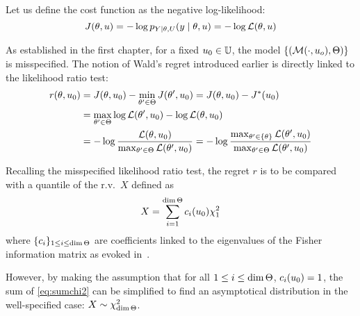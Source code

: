 \documentclass[../../Main_ManuscritThese.tex]{subfiles}
\begin{document}
Let us define the cost function as the negative log-likelihood:
\begin{equation}
  J(\theta, u) = - \log p_{Y\mid \theta, U}(y \mid \theta, u) = -\log \mathcal{L}(\theta,u)
\end{equation}

As established in the first chapter, for a fixed $u_0\in\mathbb{U}$, the model $\left\{\left(\mathcal{M}(\cdot, u_o), \Theta \right)\right\}$ is misspecified.
  The notion of Wald's regret introduced earlier is directly linked to the likelihood ratio test:
  \begin{align}
    r(\theta,u_0) &= J(\theta, u_0) - \min_{\theta^{\prime}\in\Theta}J(\theta^{\prime}, u_0) = J(\theta,u_0) - J^*(u_0)  \\
                 &= \max_{\theta^{\prime}\in\Theta} \log \mathcal{L}(\theta^{\prime}, u_0) - \log \mathcal{L}(\theta, u_0) \\
                 &= -\log \frac{\mathcal{L}(\theta, u_0)}{\max_{\theta^{\prime}\in\Theta}\mathcal{L}(\theta^{\prime}, u_0)} = -\log \frac{\max_{\theta^{\prime}\in\{\theta\}}\mathcal{L}(\theta^{\prime}, u_0)}{\max_{\theta^{\prime}\in\Theta}\mathcal{L}(\theta^{\prime}, u_0)}
  \end{align}

  Recalling the misspecified likelihood ratio test, the regret $r$ is to be compared with a quantile of the r.v.\ $X$ defined as
  \begin{equation}
    \label{eq:sumchi2}
X=\sum_{i=1}^{\dim \Theta} c_i(u_0) \chi^2_1
\end{equation}
 where $\{c_i\}_{1\leq i \leq \dim \Theta}$ are coefficients linked to the eigenvalues of the Fisher information matrix as evoked in~\label{sec:model_misspecification}.

  
 However, by making the assumption that for all $1 \leq i \leq \dim \Theta$, $c_i(u_0)=1$, the sum of \cref{eq:sumchi2} can be simplified to find an asymptotical distribution in the well-specified case: $X\sim \chi^2_{\dim \Theta}$.
\end{document}
